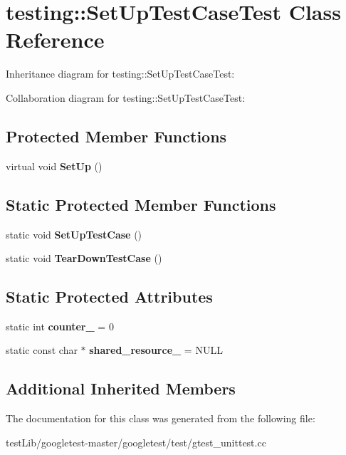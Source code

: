 \hypertarget{classtesting_1_1SetUpTestCaseTest}{}\section{testing\+:\+:Set\+Up\+Test\+Case\+Test Class Reference}
\label{classtesting_1_1SetUpTestCaseTest}


Inheritance diagram for testing\+:\+:Set\+Up\+Test\+Case\+Test\+:


Collaboration diagram for testing\+:\+:Set\+Up\+Test\+Case\+Test\+:
\subsection*{Protected Member Functions}
\begin{DoxyCompactItemize}
\item 
\mbox{\label{classtesting_1_1SetUpTestCaseTest_a4b44551ccf73e66de7ec95b2ab3b2085}} 
virtual void {\bfseries Set\+Up} ()
\end{DoxyCompactItemize}
\subsection*{Static Protected Member Functions}
\begin{DoxyCompactItemize}
\item 
\mbox{\label{classtesting_1_1SetUpTestCaseTest_a50732abc0bcb3725e6dfd6a2d487e944}} 
static void {\bfseries Set\+Up\+Test\+Case} ()
\item 
\mbox{\label{classtesting_1_1SetUpTestCaseTest_abdc133cd161ff2fa317f489da9bdccf3}} 
static void {\bfseries Tear\+Down\+Test\+Case} ()
\end{DoxyCompactItemize}
\subsection*{Static Protected Attributes}
\begin{DoxyCompactItemize}
\item 
\mbox{\label{classtesting_1_1SetUpTestCaseTest_a5b6e811128d35389be49f6569bf93817}} 
static int {\bfseries counter\+\_\+} = 0
\item 
\mbox{\label{classtesting_1_1SetUpTestCaseTest_a904e77fd9a628b6a9aca0280665fd040}} 
static const char $\ast$ {\bfseries shared\+\_\+resource\+\_\+} = N\+U\+LL
\end{DoxyCompactItemize}
\subsection*{Additional Inherited Members}


The documentation for this class was generated from the following file\+:\begin{DoxyCompactItemize}
\item 
test\+Lib/googletest-\/master/googletest/test/gtest\+\_\+unittest.\+cc\end{DoxyCompactItemize}
